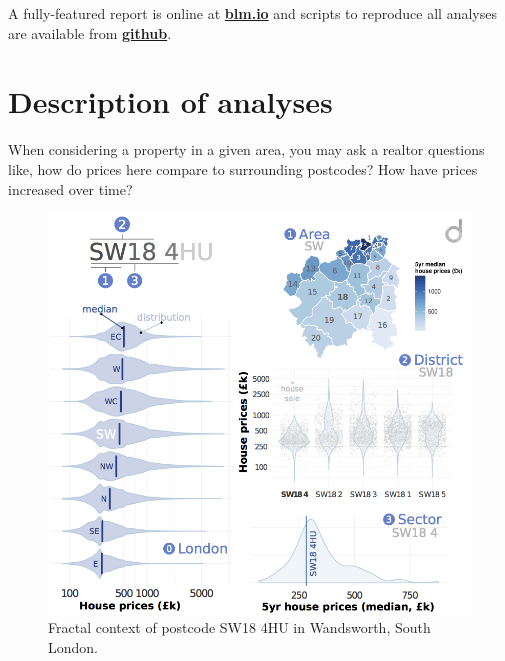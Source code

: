 \documentclass[
10pt, %
a4paper, %
oneside, %
headinclude,footinclude, %
BCOR5mm, %
]{scrartcl}
\begin{document}
A fully-featured report is online at {\bf \href{http://blm.io/datarea}{blm.io} }and
scripts to reproduce all analyses are available from
{\bf \href{http://github.com/blmoore/summerdatachallenge}{github}}.


{\let\thefootnote\relax{}}




\section{Description of analyses}

When considering a property in a given area, you may ask a realtor
questions like, how do prices here compare to surrounding postcodes?
How have prices increased over time? 

\setlength{\intextsep}{.1em}
\begin{figure}
\begin{center}
\includegraphics[width=.44\textwidth]{Figures/fractal.png}
\caption{ Fractal context of postcode SW18 4HU in Wandsworth, South London.}
\end{center}
\end{figure}
\end{document}
